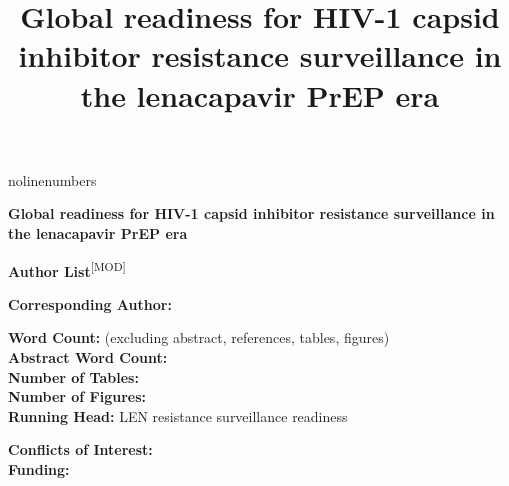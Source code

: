\documentclass[12pt]{article}
\title{Global readiness for HIV-1 capsid inhibitor resistance surveillance in the lenacapavir PrEP era}
\newcommand{\GradeModerate}{\textsuperscript{\textsf{[MOD]}}}
\begin{document}
nolinenumbers

\begin{titlepage}
    \centering
    \vspace*{2cm}

    {\LARGE\bfseries
    Global readiness for HIV-1 capsid inhibitor resistance surveillance in the lenacapavir PrEP era
    \par}

    \vspace{2cm}

    \large
    \textbf{Author List}\GradeModerate \\[0.5cm]
    {\small
    
    \par}

    \vspace{1.5cm}

    {\small
    
    \par}

    \vspace{2cm}

    {\small
    \textbf{Corresponding Author:} \\
    
    \par}

    \vspace{1cm}

    {\small
    \textbf{Word Count:} \TotalWords (excluding abstract, references, tables, figures) \\
    \textbf{Abstract Word Count:} \AbstractWords \\
    \textbf{Number of Tables:} \NumTables \\
    \textbf{Number of Figures:} \NumFigures \\
    \textbf{Running Head:} LEN resistance surveillance readiness
    \par}

    \vspace{1cm}

    {\small
    \textbf{Conflicts of Interest:}  \\
    \textbf{Funding:} 
    \par}

    \pagebreak
\end{titlepage}
\end{document}
